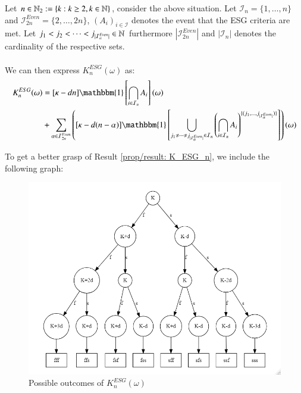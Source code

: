 \begin{result}
\label{prop/result: K_ESG_n}
Let $n \in \mathbb{N}_{2}:= \{k: k\geq 2, k\in \mathbb{N}\}$, consider the above situation. Let $\mathcal{I}_{n} = \{1, \dots, n\}$ and $\mathcal{I}_{2n}^{Even} = \{2, \dots, 2n\}$,
$(A_{i})_{i\in \mathcal{I}}$ denotes the event that the ESG criteria are met.
Let $j_{1} < j_{2} < \dots < j_{|\mathcal{I}_{\alpha}^{Even}|} \in \mathbb{N}$
furthermore $|\mathcal{I}_{2n}^{Even}|$ and $|\mathcal{I}_{n}|$ denotes the cardinality of the respective sets. 
\\~\\ 
We can then express $K_{n}^{ESG}(\omega)$ as:
\begin{align*}
K_{n}^{ESG}(\omega) &= 
[\kappa -dn]\mathbbm{1}\left[
\bigcap_{i\in \mathcal{I}_{n}}A_{i}
\right](\omega) \\ 
&+ 
\sum_{\alpha \in \mathcal{I}_{2n}^{Even}}
\left(
[\kappa -d(n-\alpha)]\mathbbm{1}\left[
\bigcup_{
j_{1}\neq \dots \neq j_{|\mathcal{I}_{\alpha}^{Even}|}
\in \mathcal{I}_{n}
}\left(
\bigcap_{i\in \mathcal{I}_{n}}A_{i}
\right)^{
\{
(j_{1}, \dots , j_{|\mathcal{I}_{\alpha}^{Even}|})
\}
}
\right]
\right)(\omega) 
\end{align*}
\end{result}  


\newpage 

To get a better grasp of Result \ref{prop/result: K_ESG_n}, we include the following graph: 
\begin{figure}[htp]
    \centering
    \includegraphics[width=13cm]{figures/ESG/tree_plt_ESG_seq.png}
    \caption{Possible outcomes of $K_{n}^{ESG}(\omega)$}
    \label{fig: Tree_plot_ESG_sequence}
\end{figure}

